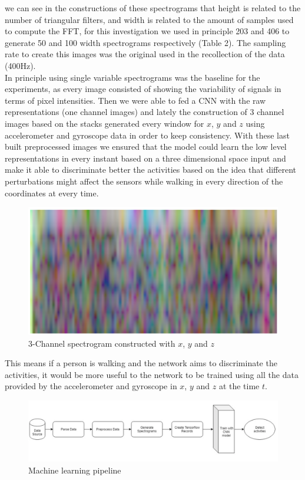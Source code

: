 \documentclass[10pt,halfline,a4paper]{ouparticle}
\begin{document}
\noindent
we can see in the constructions of these spectrograms that height is related to the number of triangular filters, and width is related to the amount of samples used to compute the FFT, for this investigation we used in principle 203 and 406 to generate 50 and 100 width spectrograms respectively (Table 2). The sampling rate to create this images was the original used in the recollection of the data (400Hz). \\


\noindent
In principle using single variable spectrograms was the baseline for the experiments, as every image consisted of showing the variability of signals in terms of pixel intensities. Then we were able to fed a CNN with the raw representations (one channel images) and lately the construction of 3 channel images based on the stacks generated every window for $x$, $y$ and $z$ using accelerometer and gyroscope data in order to keep consistency. With these last built preprocessed images we ensured that the model could learn the low level representations in every instant based on a three dimensional space input and make it able to discriminate better the activities based on the idea that different perturbations might affect the sensors while walking in every direction of the coordinates at every time.\\

\begin{figure}[H]
	\centering
	\includegraphics[width=0.3\linewidth]{3channel}
	\caption{3-Channel spectrogram constructed with $x$, $y$ and $z$}
	\label{fig:3channel}
\end{figure}


\noindent
This means if a person is walking and the network aims to discriminate the activities, it would be more useful to the network to be trained using all the data provided by the accelerometer and gyroscope in $x$, $y$ and $z$ at the time $t$.

\begin{figure}[H]
	\centering
	\includegraphics[width=0.7\linewidth]{mlpipeline}
	\caption{Machine learning pipeline}
	\label{fig:mlpipeline}
\end{figure}
\end{document}
